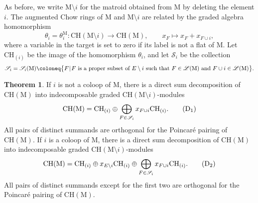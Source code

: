 \documentclass[11pt,reqno]{amsart}
\theoremstyle{definition}
\newtheorem{theorem}{Theorem}[section]
\theoremstyle{remark}
\renewcommand{\(}{\left(}
\renewcommand{\)}{\right)}
\newcommand{\<}{\left<}
\renewcommand{\>}{\right>}
\renewcommand{\mid}{\hspace{0.3mm}|\hspace{0.3mm}}
\begin{document}
As before, we write $\mathrm{M} \setminus i$ for the matroid obtained from $\mathrm{M}$ by deleting the element $i$.
The augmented Chow rings of $\mathrm{M}$ and $\mathrm{M} \setminus i$ are related by the  graded algebra homomorphism 
\[
\theta_i=\theta^\mathrm{M}_i: \mathrm{CH}(\mathrm{M} \setminus i) \longrightarrow \mathrm{CH}(\mathrm{M}), \qquad x_F \longmapsto x_F + x_{F \cup i},
\]
where a variable in the target is set to zero if its label is not a flat of $\mathrm{M}$. %
Let $\mathrm{CH}_{(i)}$ be the image of the homomorphism $\theta_i$, and let
$\mathscr{S}_i$ be the collection 
\[
\mathscr{S}_i=\mathscr{S}_i(\mathrm{M})\coloneq\big\{F \mid \text{$F$ is a proper subset of $E \setminus i$ such that $F \in \mathscr{L}(\mathrm{M})$ and $F\cup i \in \mathscr{L}(\mathrm{M})$}\big\}.
\]

\begin{theorem}\label{TheoremDecomposition}
If $i$ is not a coloop of $\mathrm{M}$, there is  a direct sum decomposition of $\mathrm{CH}(\mathrm{M}) $ into indecomposable graded $\mathrm{CH}(\mathrm{M}\setminus i)$-modules
\begin{equation}\label{eqn:deletion decomposition}
\mathrm{CH}(\mathrm{M}) = \mathrm{CH}_{(i)} \oplus \bigoplus_{F \in \mathscr{S}_i} x_{F\cup i} \mathrm{CH}_{(i)}. \tag{$\mathrm{D}_1$}
\end{equation}
All pairs of distinct summands are orthogonal for the Poincar\'e pairing of $\mathrm{CH}(\mathrm{M})$.
If $i$ is a coloop of $\mathrm{M}$,  there is a direct sum decomposition of $\mathrm{CH}(\mathrm{M}) $ into indecomposable graded  $\mathrm{CH}(\mathrm{M}\setminus i)$-modules
\begin{equation}\label{eqn:deletion decomp coloop}
\mathrm{CH}(\mathrm{M}) = \mathrm{CH}_{(i)} \oplus x_{E\setminus i}\mathrm{CH}_{(i)} \oplus \bigoplus_{F\in \mathscr{S}_i} x_{F\cup i} \mathrm{CH}_{(i)}. \tag{$\mathrm{D}_2$}
\end{equation}
All pairs of distinct summands except for the first two are orthogonal for the Poincar\'e pairing of $\mathrm{CH}(\mathrm{M})$.
\end{theorem}
\end{document}
